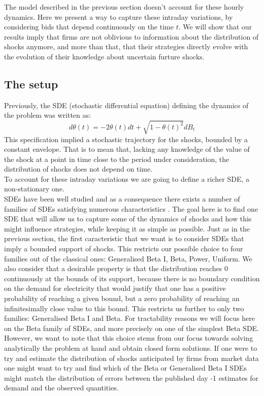 The model described in the previous section doesn't account for these hourly dynamics. Here we present a way to capture these intraday variations, by considering bids that depend continuously on the time $t$. We will show that our results imply that firms are not oblivious to information about the distribution of shocks anymore, and more than that, that their strategies directly evolve with the evolution of their knowledge about uncertain furture shocks.\\


\subsection{The setup}\label{setupdyn}
Previously, the SDE (stochastic differential equation) defining the dynamics of the problem was written as: 
$$d\theta(t)=-2\theta(t) dt+\sqrt{1-\theta(t)^2}dB_t$$ 
This specification implied a stochastic trajectory for the shocks, bounded by a constant envelope. That is to mean that, lacking any knowledge of the value of the shock at a point in time close to the period under consideration, the distribution of shocks does not depend on time.\\

To account for these intraday variations we are going to define a richer SDE, a non-stationary one. \\

SDEs have been well studied and as a consequence there exists a number of families of SDEs satisfying numerous characteristics \cite{enveloppe}. The goal here is to find one SDE that will allow us to capture some of the dynamics of shocks and how this might influence strategies, while keeping it as simple as possible. Just as in the previous section, the first caracteristic that we want is to consider SDEs that imply a bounded support of shocks. This restricts our possible choice to four families out of the classical ones: Generalised Beta I, Beta, Power, Uniform. We also consider that a desirable property is that the distribution reaches 0 continuously at the bounds of its support, because there is no boundary condition on the demand for electricity that would justify that one has a positive probability of reaching a given bound, but a zero probability of reaching an infinitesimally close value to this bound. This restricts us further to only two families: Generalised Beta I and Beta. For tractability reasons we will focus here on the Beta family of SDEs, and more precisely on one of the simplest Beta SDE. However, we want to note that this choice stems from our focus towards solving analytically the problem at hand and obtain closed form solutions. If one were to try and estimate the distribution of shocks anticipated by firms from market data one might want to try and find which of the Beta or Generalised Beta I SDEs might match the distribution of errors between the published day -1 estimates for demand and the observed quantities.\\

